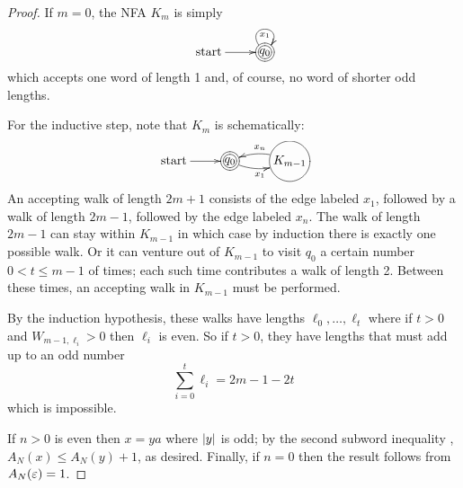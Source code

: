 \begin{proof}
			If $m=0$, the NFA $K_m$ is simply
			\[
			\xymatrix{
			\text{start}\ar[r]&*+[Foo]{q_0}\ar@(ul,ur)_{x_1}
			}
			\]
			which accepts one word of length 1 and, of course, no word of shorter odd lengths.

			For the inductive step, note that $K_m$ is schematically:
			\[
			\xymatrix{
						\text{start}\ar[r]
						&*+[Foo]{q_0}\ar@/_/[r]_{x_1}
						&*+[Fo]{K_{m-1}}\ar@/_/[l]_{x_n}
			}
			\]
			An accepting walk of length $2m+1$ consists of the edge labeled $x_1$, followed by a walk of length $2m-1$, followed by the edge labeled $x_n$.
			The walk of length $2m-1$ can stay within $K_{m-1}$ in which case by induction there is exactly one possible walk.
			Or it can venture out of $K_{m-1}$ to visit $q_0$ a certain number $0<t\le m-1$ of times; each such time contributes a walk of length 2.
			Between these times, an accepting walk in $K_{m-1}$ must be performed.
			
			By the induction hypothesis, these walks have lengths $\ell_0,\dots,\ell_t$ where if $t>0$ and $W_{m-1,\ell_i}>0$ then $\ell_i$ is even.
			So if $t>0$, they have lengths that must add up to an odd number
			\[
			\sum_{i=0}^{t} \ell_i = 2m-1 - 2t
			\]
			which is impossible.

			If $n>0$ is even then $x=ya$ where $\lvert y\rvert$ is odd; by the second subword inequality  , $A_N(x)\le A_N(y)+1$, as desired.
			Finally, if $n=0$ then the result follows from $A_N(\varepsilon)=1$.
		\end{proof}
